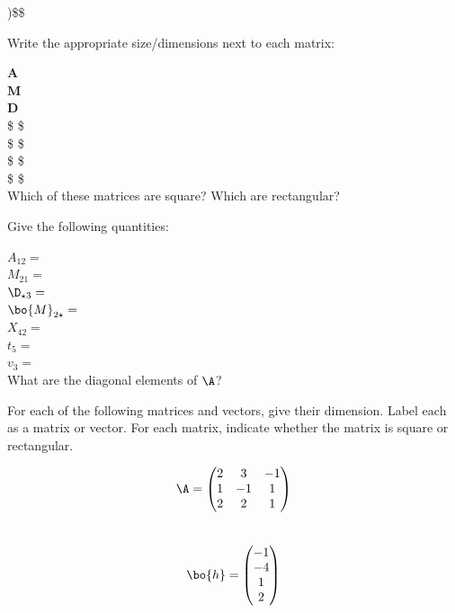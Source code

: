 \documentclass[
]{article}
\theoremstyle{definition}
\theoremstyle{definition}
\theoremstyle{definition}
\theoremstyle{definition}
\theoremstyle{remark}
\begin{document}
\right)\$\$

Write the appropriate size/dimensions next to each matrix:

\(\mathbf{A}\)\\

\(\mathbf{M}\)\\

\(\mathbf{D}\)\\

\$ \$\\

\$ \$\\

\$ \$\\

\$ \$\\

Which of these matrices are square? Which are rectangular?

Give the following quantities:

\(A_{12}=\)\\

\(M_{21}=\)\\

\(\D_{\star3}=\)\\

\(\bo{M}_{2\star}=\)\\

\(X_{42}=\)\\

\(t_5=\)\\

\(v_3=\)\\

What are the diagonal elements of \(\A\)?

For each of the following matrices and vectors, give their dimension. Label each as a matrix or vector. For each matrix, indicate whether the matrix is square or rectangular.

\[\A=\left(\begin{matrix} 2 & 3 & -1\\1&-1&1\\2&2&1 \end{matrix}\right)\]\\

\[\bo{h}=\left(\begin{matrix} -1\\-4\\1\\2 \end{matrix}\right)\]\\
\end{document}
